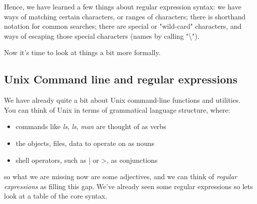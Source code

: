 Hence, we have learned a few things about regular expression syntax: we have ways of matching certain characters, or ranges of characters; there 
is shorthand notation for common searches; there are special or "wild-card" characters, and ways of escaping those special characters (names by
calling "\textbackslash"). 

Now it's time to look at things a bit more formally. 



\subsection{Unix Command line and regular expressions}

We have already quite a bit about Unix command-line functions and utilities. You can think of Unix in terms of grammatical language structure, where:

\begin{itemize}
    \item commands like \textit{ls}, \textit{ls}, \textit{man} are thought of as verbs
    \item the objects, files, data to operate on as nouns
    \item shell operators, such as | or >, as conjunctions
\end{itemize}

so what we are missing now are some adjectives, and we can think of \textit{regular expressions} as filling this gap. We've already seen some regular expressions so lets look at a table of the core syntax. 

